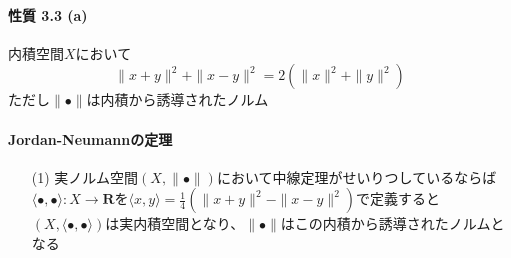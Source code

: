 \documentclass[12pt,a4paper]{article}
\begin{document}
  \paragraph{性質 3.3 (a)}
    内積空間$X$において \\
    \[ \parallel x + y \parallel^2 + \parallel x - y \parallel^2 = 2(\parallel x \parallel^2 + \parallel y \parallel^2) \]
    ただし$\parallel\bullet\parallel$は内積から誘導されたノルム

  \paragraph{Jordan-Neumannの定理}
    \begin{itemize}
      \item[(1)] 実ノルム空間$(X, \parallel\bullet\parallel)$において中線定理がせいりつしているならば \\
        $\langle\bullet,\bullet\rangle: X \rightarrow \mathbf{R}$を$\langle x, y \rangle = \frac14 ( \parallel x + y \parallel^2 - \parallel x - y \parallel^2 )$で定義すると \\
        $(X, \langle\bullet,\bullet\rangle)$は実内積空間となり、$\parallel\bullet\parallel$はこの内積から誘導されたノルムとなる
    \end{itemize}
  
\end{document}
